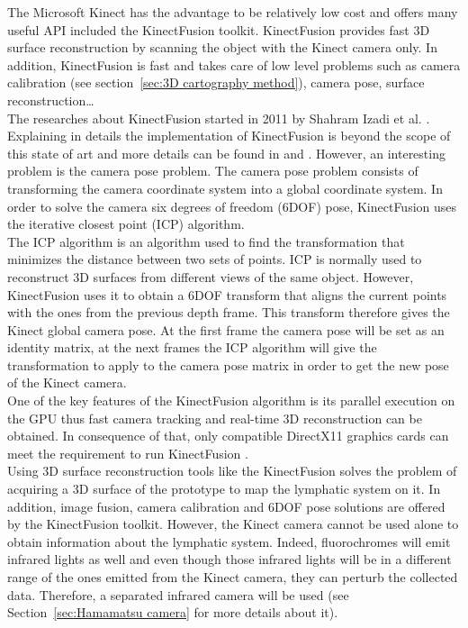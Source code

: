 The Microsoft Kinect has the advantage to be relatively low cost and offers many useful API included the KinectFusion toolkit. KinectFusion provides fast 3D surface reconstruction by scanning the object with the Kinect camera only. In addition, KinectFusion is fast and takes care of low level problems such as camera calibration (see section~\ref{sec:3D cartography method}), camera pose, surface reconstruction\ldots \\

The researches about KinectFusion started in 2011 by Shahram Izadi et al. \cite{izadi_kinectfusion:_2011}. Explaining in details the implementation of KinectFusion is beyond the scope of this state of art and more details can be found in \cite{newcombe_kinectfusion:_2011} and \cite{izadi_kinectfusion:_2011}. However, an interesting problem is the camera pose problem. The camera pose problem consists of transforming the camera coordinate system into a global coordinate system. In order to solve the camera six degrees of freedom (6DOF) pose, KinectFusion uses the iterative closest point (ICP) algorithm.\\

The ICP algorithm is an algorithm used to find the transformation that minimizes the distance between two sets of points. ICP is normally used to reconstruct 3D surfaces from different views of the same object. However, KinectFusion uses it to obtain a 6DOF transform that aligns the current points with the ones from the previous depth frame. This transform therefore gives the Kinect global camera pose. At the first frame the camera pose will be set as an identity matrix, at the next frames the ICP algorithm will give the transformation to apply to the camera pose matrix in order to get the new pose of the Kinect camera.\\

One of the key features of the KinectFusion algorithm is its parallel execution \cite{izadi_kinectfusion:_2011} on the GPU thus fast camera tracking and real-time 3D reconstruction can be obtained. In consequence of that, only compatible DirectX11 graphics cards can meet the requirement to run KinectFusion \cite{kinect}.\\

Using 3D surface reconstruction tools like the KinectFusion solves the problem of acquiring a 3D surface of the prototype to map the lymphatic system on it.  In addition, image fusion, camera calibration and 6DOF pose solutions are offered by the KinectFusion toolkit. However, the Kinect camera cannot be used alone to obtain information about the lymphatic system. Indeed, fluorochromes will emit infrared lights as well and even though those infrared lights will be in a different range of the ones emitted from the Kinect camera, they can perturb the collected data. Therefore, a separated infrared camera will be used (see Section~\ref{sec:Hamamatsu camera} for more details about it).

